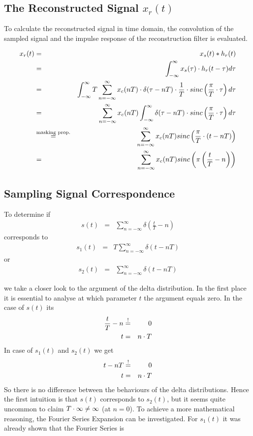 \subsection{The Reconstructed Signal $x_r(t)$}

To calculate the reconstructed signal in time domain, the convolution of the sampled signal and the impulse response of the reconstruction filter is evaluated.

\begin{eqnarray*}
x_r(t) & = & x_s(t) \ast h_r(t) \\
& = & \int_{-\infty}^{\infty} x_s(\tau) \cdot h_r(t-\tau) d\tau \\
& = & \int_{-\infty}^{\infty} T \sum_{n=-\infty}^{\infty} x_c(nT) \cdot \delta (\tau-nT) \cdot \frac{1}{T} \cdot sinc\left(\frac{\pi}{T}\cdot \tau\right) d\tau \\
& = &  \sum_{n=-\infty}^{\infty} x_c(nT) \int_{-\infty}^{\infty} \delta (\tau-nT) \cdot sinc\left(\frac{\pi}{T}\cdot \tau\right) d\tau  \\
& \overset{\text{masking prop.}}{=} &  \sum_{n=-\infty}^{\infty} x_c(nT) sinc\left(\frac{\pi}{T}\cdot (t-nT)\right) \\
& = &  \sum_{n=-\infty}^{\infty} x_c(nT) sinc\left(\pi \left(\frac{t}{T}-n\right)\right)
\end{eqnarray*}

\subsection{Sampling Signal Correspondence}

To determine if
\begin{eqnarray*}
s(t) & = & \sum_{n=-\infty}^{\infty} \delta \left(\frac{t}{T}-n\right)
\end{eqnarray*}
corresponds to
\begin{eqnarray*}
s_1(t) & = & T \sum_{n=-\infty}^{\infty} \delta (t-nT)
\end{eqnarray*}
or
\begin{eqnarray*}
s_2(t) & = & \sum_{n=-\infty}^{\infty} \delta (t-nT)
\end{eqnarray*}

we take a closer look to the argument of the delta distribution. In the first place it is essential to analyse at which parameter $t$ the argument equals zero. In the case of $s(t)$ its
\begin{eqnarray*}
\frac{t}{T}-n & \overset{!}{=} & 0 \\
t & = & n\cdot T
\end{eqnarray*}
In case of $s_1(t)$ and $s_2(t)$ we get
\begin{eqnarray*}
t-nT & \overset{!}{=} & 0 \\
t & = & n\cdot T
\end{eqnarray*}
So there is no difference between the behaviours of the delta distributions. Hence the first intuition is that $s(t)$ corresponds to $s_2(t)$, but it seems quite uncommon to claim $T \cdot \infty \neq \infty$ (at $n = 0$). To achieve a more mathematical reasoning, the Fourier Series Expansion can be investigated. For $s_1(t)$ it was already shown that the Fourier Series is

